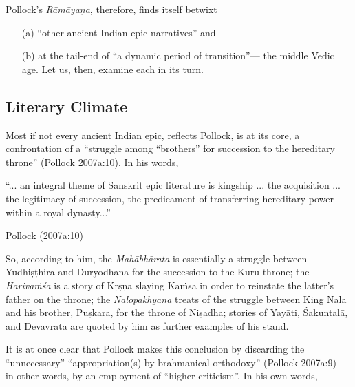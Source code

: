 Pollock's {\sl Rāmāyaṇa}, therefore, finds itself betwixt\\[-20pt] 
\begin{itemize}
\itemsep=1pt
\item[(a)] “other ancient Indian epic narratives” and

\item[(b)] at the tail-end of “a dynamic period of transition”--- the middle Vedic age. Let us, then, examine each in its turn.\\[-18pt]
\end{itemize}

\subsection{Literary Climate}\label{sec1.1.1}

Most if not every ancient Indian epic, reflects Pollock, is at its core, a confrontation of a “struggle among “brothers” for succession to the hereditary throne” (Pollock 2007a:10).  In his words, 
\vskip 1pt

\begin{myquote}
“... an integral theme of Sanskrit epic literature is kingship ... the acquisition ... the legitimacy of succession, the predicament of transferring hereditary power within a royal dynasty...”

\hfill Pollock (2007a:10)
\end{myquote}

So, according to him, the {\sl Mahābhārata} is essentially a struggle between Yudhiṣṭhira and Duryodhana for the succession to the Kuru throne; the {\sl Harivaṁśa} is a story of Kṛṣṇa slaying Kaṁsa in order to reinstate the latter’s father on the throne; the {\sl Nalopākhyāna} treats of the struggle between King Nala and his brother, Puṣkara, for the throne of Niṣadha; stories of Yayāti, Śakuntalā, and Devavrata are quoted by him as further examples of his stand. 
\vskip 1pt

It is at once clear that Pollock makes this conclusion by discarding the “unnecessary” “appropriation(s) by brahmanical orthodoxy” (Pollock 2007a:9) --- in other words, by an employment of “higher criticism”. In his own words, 
\vskip 1pt


